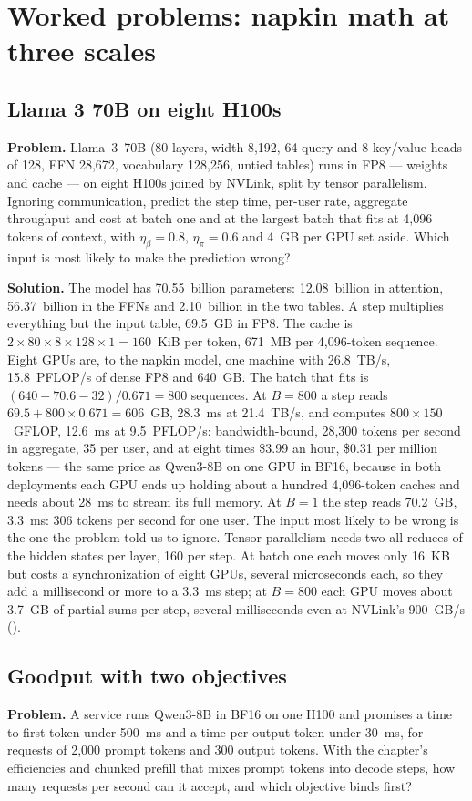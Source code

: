 \section{Worked problems: napkin math at three scales}

\subsection{Llama 3 70B on eight H100s}
\textbf{Problem.} Llama~3~70B (80 layers, width 8,192, 64 query and 8 key/value
heads of 128, FFN 28,672, vocabulary 128,256, untied tables) runs in FP8 ---
weights and cache --- on eight H100s joined by NVLink, split by tensor
parallelism. Ignoring communication, predict the step time, per-user rate,
aggregate throughput and cost at batch one and at the largest batch that fits at
4,096 tokens of context, with $\eta_\beta = 0.8$, $\eta_\pi = 0.6$ and 4~GB per GPU
set aside. Which input is most likely to make the prediction wrong?

\textbf{Solution.} The model has 70.55~billion parameters: 12.08~billion in
attention, 56.37~billion in the FFNs and 2.10~billion in the two tables. A step
multiplies everything but the input table, 69.5~GB in FP8. The cache is
$2 \times 80 \times 8 \times 128 \times 1 = 160$~KiB per token, 671~MB per
4,096-token sequence. Eight GPUs are, to the napkin model, one machine with
26.8~TB/s, 15.8~PFLOP/s of dense FP8 and 640~GB. The batch that fits is
$(640 - 70.6 - 32) / 0.671 = 800$ sequences. At $B = 800$ a step reads
$69.5 + 800 \times 0.671 = 606$~GB, 28.3~ms at 21.4~TB/s, and computes
$800 \times 150$~GFLOP, 12.6~ms at 9.5~PFLOP/s: bandwidth-bound, 28,300 tokens per
second in aggregate, 35 per user, and at eight times \$3.99 an hour, \$0.31 per
million tokens --- the same price as Qwen3-8B on one GPU in BF16, because in both
deployments each GPU ends up holding about a hundred 4,096-token caches and
needs about 28~ms to stream its full memory. At $B = 1$ the step
reads 70.2~GB, 3.3~ms: 306 tokens per second for one user. The input most likely
to be wrong is the one the problem told us to ignore. Tensor parallelism needs two
all-reduces of the hidden states per layer, 160 per step. At batch one each moves
only 16~KB but costs a synchronization of eight GPUs, several microseconds each,
so they add a millisecond or more to a 3.3~ms step; at $B = 800$ each GPU moves
about 3.7~GB of partial sums per step, several milliseconds even at NVLink's
900~GB/s ().

\subsection{Goodput with two objectives}
\textbf{Problem.} A service runs Qwen3-8B in BF16 on one H100 and promises a
time to first token under 500~ms and a time per output token under 30~ms, for
requests of 2,000 prompt tokens and 300 output tokens. With the chapter's
efficiencies and chunked prefill that mixes prompt tokens into decode steps, how
many requests per second can it accept, and which objective binds first?

